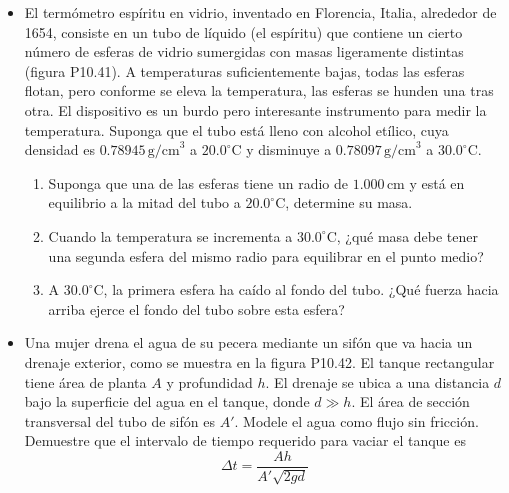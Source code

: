 \documentclass[11pt,a4paper]{article}
\begin{document}
\begin{itemize}
    \item[\textbf{41.}] El termómetro espíritu en vidrio, inventado en Florencia, Italia, alrededor de 1654, consiste en un tubo de líquido (el espíritu) que contiene un cierto número de esferas de vidrio sumergidas con masas ligeramente distintas (figura P10.41). A temperaturas suficientemente bajas, todas las esferas flotan, pero conforme se eleva la temperatura, las esferas se hunden una tras otra. El dispositivo es un burdo pero interesante instrumento para medir la temperatura. Suponga que el tubo está lleno con alcohol etílico, cuya densidad es \(0.789 45\,\text{g/cm}^3\) a \(20.0^\circ\text{C}\) y disminuye a \(0.780 97\,\text{g/cm}^3\) a \(30.0^\circ\text{C}\).
    \begin{enumerate}
        \item Suponga que una de las esferas tiene un radio de \(1.000\,\text{cm}\) y está en equilibrio a la mitad del tubo a \(20.0^\circ\text{C}\), determine su masa.
        \item Cuando la temperatura se incrementa a \(30.0^\circ\text{C}\), ¿qué masa debe tener una segunda esfera del mismo radio para equilibrar en el punto medio?
        \item A \(30.0^\circ\text{C}\), la primera esfera ha caído al fondo del tubo. ¿Qué fuerza hacia arriba ejerce el fondo del tubo sobre esta esfera?
    \end{enumerate}
    
    \vspace*{8cm}
    
    \item[\textbf{42.}] Una mujer drena el agua de su pecera mediante un sifón que va hacia un drenaje exterior, como se muestra en la figura P10.42. El tanque rectangular tiene área de planta \(A\) y profundidad \(h\). El drenaje se ubica a una distancia \(d\) bajo la superficie del agua en el tanque, donde \(d \gg h\). El área de sección transversal del tubo de sifón es \(A'\). Modele el agua como flujo sin fricción. Demuestre que el intervalo de tiempo requerido para vaciar el tanque es
    \[
    \Delta t = \frac{Ah}{A' \sqrt{2gd}}
    \]
    
    \vspace*{7cm}
    

\end{itemize}
\end{document}
